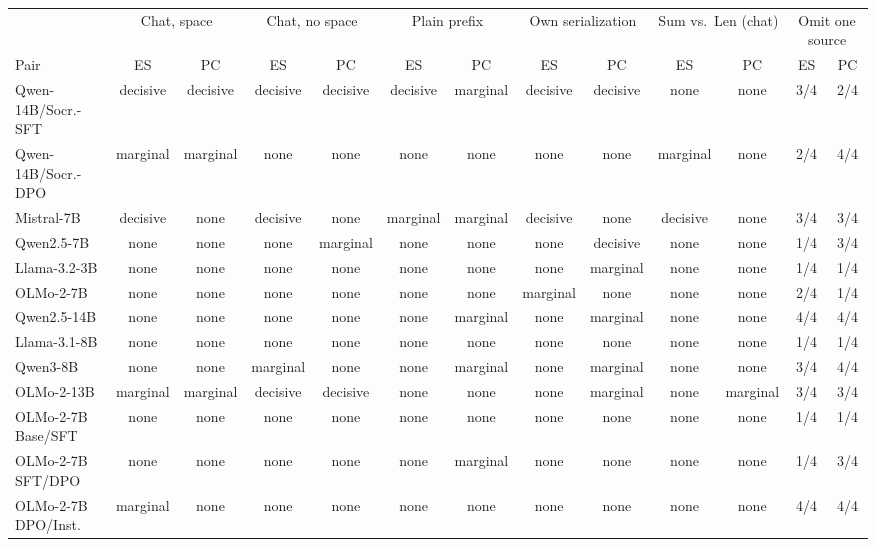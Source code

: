\begin{table}[t]
\centering\scriptsize
\setlength{\tabcolsep}{2.4pt}
\begin{tabular}{@{}lcccccccccccc@{}}
\toprule
& \multicolumn{2}{c}{Chat, space} & \multicolumn{2}{c}{Chat, no space} & \multicolumn{2}{c}{Plain prefix} & \multicolumn{2}{c}{Own serialization} & \multicolumn{2}{c}{Sum vs.\ Len (chat)} & \multicolumn{2}{c}{Omit one source} \\
\cmidrule(lr){2-3}\cmidrule(lr){4-5}\cmidrule(lr){6-7}\cmidrule(lr){8-9}\cmidrule(lr){10-11}\cmidrule(l){12-13}
Pair & ES & PC & ES & PC & ES & PC & ES & PC & ES & PC & ES & PC \\
\midrule
Qwen-14B/Socr.-SFT & decisive & decisive & decisive & decisive & decisive & marginal & decisive & decisive & none & none & 3/4 & 2/4 \\
Qwen-14B/Socr.-DPO & marginal & marginal & none & none & none & none & none & none & marginal & none & 2/4 & 4/4 \\
Mistral-7B & decisive & none & decisive & none & marginal & marginal & decisive & none & decisive & none & 3/4 & 3/4 \\
Qwen2.5-7B & none & none & none & marginal & none & none & none & decisive & none & none & 1/4 & 3/4 \\
Llama-3.2-3B & none & none & none & none & none & none & none & marginal & none & none & 1/4 & 1/4 \\
OLMo-2-7B & none & none & none & none & none & none & marginal & none & none & none & 2/4 & 1/4 \\
Qwen2.5-14B & none & none & none & none & none & marginal & none & marginal & none & none & 4/4 & 4/4 \\
Llama-3.1-8B & none & none & none & none & none & none & none & none & none & none & 1/4 & 1/4 \\
Qwen3-8B & none & none & marginal & none & none & marginal & none & marginal & none & none & 3/4 & 4/4 \\
OLMo-2-13B & marginal & marginal & decisive & decisive & none & none & none & marginal & none & marginal & 3/4 & 3/4 \\
OLMo-2-7B Base/SFT & none & none & none & none & none & none & none & none & none & none & 1/4 & 1/4 \\
OLMo-2-7B SFT/DPO & none & none & none & none & none & marginal & none & none & none & none & 1/4 & 3/4 \\
OLMo-2-7B DPO/Inst. & marginal & none & none & none & none & none & none & none & none & none & 4/4 & 4/4 \\

\end{tabular}
\end{table}
